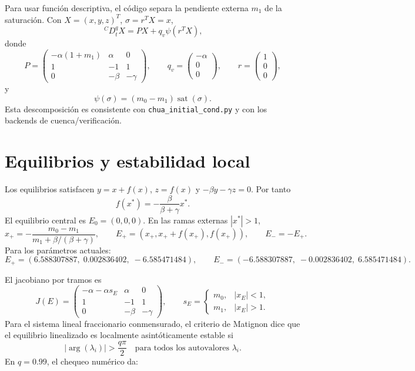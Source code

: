 \documentclass[11pt]{article}
\newcommand{\CaputoD}{\,{}^{C}D_t^q}
\begin{document}
Para usar función descriptiva, el código separa la pendiente externa \(m_1\)
de la saturación. Con \(X=(x,y,z)^T\), \(\sigma=r^TX=x\),
\[
\CaputoD X = PX+q_v\psi(r^TX),
\]
donde
\[
P=
\begin{pmatrix}
-\alpha(1+m_1) & \alpha & 0\\
1&-1&1\\
0&-\beta&-\gamma
\end{pmatrix},\qquad
q_v=
\begin{pmatrix}
-\alpha\\0\\0
\end{pmatrix},\qquad
r=
\begin{pmatrix}
1\\0\\0
\end{pmatrix},
\]
y
\[
\psi(\sigma)=(m_0-m_1)\operatorname{sat}(\sigma).
\]
Esta descomposición es consistente con \texttt{chua\_initial\_cond.py} y con
los backends de cuenca/verificación.

\section{Equilibrios y estabilidad local}

Los equilibrios satisfacen \(y=x+f(x)\), \(z=f(x)\) y
\(-\beta y-\gamma z=0\). Por tanto
\[
f(x^\ast)=-\frac{\beta}{\beta+\gamma}x^\ast.
\]
El equilibrio central es \(E_0=(0,0,0)\). En las ramas externas
\(|x^\ast|>1\),
\[
x_+ =
-\frac{m_0-m_1}{m_1+\beta/(\beta+\gamma)},\qquad
E_+=(x_+,x_+ + f(x_+),f(x_+)),\qquad
E_-=-E_+.
\]
Para los parámetros actuales:
\[
E_+=(6.588307887,\;0.002836402,\;-6.585471484),\qquad
E_-=(-6.588307887,\;-0.002836402,\;6.585471484).
\]

El jacobiano por tramos es
\[
J(E)=
\begin{pmatrix}
-\alpha-\alpha s_E & \alpha & 0\\
1&-1&1\\
0&-\beta&-\gamma
\end{pmatrix},
\qquad
s_E=
\begin{cases}
m_0,& |x_E|<1,\\
m_1,& |x_E|>1.
\end{cases}
\]
Para el sistema lineal fraccionario conmensurado, el criterio de Matignon dice
que el equilibrio linealizado es localmente asintóticamente estable si
\[
|\arg(\lambda_i)|>\frac{q\pi}{2}
\quad\text{para todos los autovalores } \lambda_i.
\]
En \(q=0.99\), el chequeo numérico da:
\end{document}
